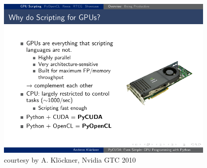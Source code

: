 \documentclass[]{beamer}
\begin{document}
\begin{frame}
\begin{columns}
\begin{column}{.65\textwidth}
\begin{itemize}
        \end{itemize}
    \end{column}
    \begin{column}{.45\textwidth}
        \begin{figure}
            \begin{minipage}{0.65\textwidth}
                \includegraphics[width=\textwidth]{pics/tesla_card}
                \caption{courtesy by A. Kl\"{o}ckner, Nvidia GTC 2010}
            \end{minipage}
        \end{figure}   
    \end{column}
    \hspace*{-2cm}
\end{columns}
\end{frame}
\end{document}
